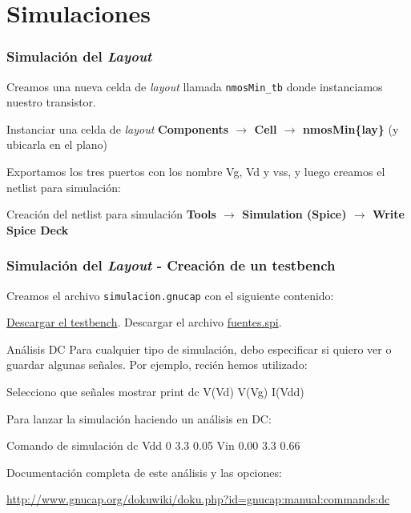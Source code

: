 \documentclass{beamer}
\begin{document}
\section{Simulaciones}
\begin{frame}[fragile]
  \frametitle{Simulación del \emph{Layout}}
  Creamos una nueva celda de \emph{layout} llamada \verb.nmosMin_tb. donde instanciamos nuestro transistor.
  \begin{exampleblock}{Instanciar una celda de \emph{layout}}
\textbf{
Components $\rightarrow$ Cell $\rightarrow$ nmosMin\{lay\}} (y ubicarla en el plano)
  \end{exampleblock}

  Exportamos los tres puertos con los nombre Vg, Vd y vss, y luego creamos el netlist para simulación:
   \begin{exampleblock}{Creación del netlist para simulación}
   \textbf{
Tools $\rightarrow$ Simulation (Spice) $\rightarrow$ Write Spice Deck
}
   \end{exampleblock}

\end{frame}
\begin{frame}[fragile]
  \frametitle{Simulación del \emph{Layout} - Creación de un testbench}
  Creamos el archivo \verb_simulacion.gnucap_ con el siguiente contenido:
  \begin{tiny}
%    
\end{tiny}
\href{run:gnucap/simulacion.gnucap}{Descargar el testbench}. Descargar el archivo \href{run:gnucap/fuentes.spi}{fuentes.spi}. 
\end{frame}
\begin{frame}{Análisis DC}
Para cualquier tipo de simulación, debo especificar si quiero ver o guardar algunas señales. Por ejemplo, recién hemos utilizado:
  \begin{exampleblock}{Selecciono que señales mostrar}
    print dc V(Vd) V(Vg) I(Vdd)
  \end{exampleblock}

Para lanzar la simulación haciendo un análisis en DC:

  \begin{exampleblock}{Comando de simulación}
dc Vdd 0 3.3 0.05 Vin 0.00 3.3 0.66 
  \end{exampleblock}

  Documentación completa de este análisis y las opciones:
  \begin{tiny}
  \url{http://www.gnucap.org/dokuwiki/doku.php?id=gnucap:manual:commands:dc}
  \end{tiny}

\end{frame}
\end{document}

